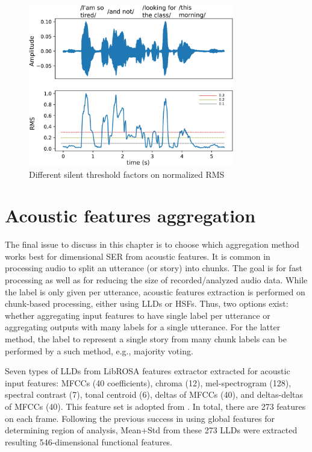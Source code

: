 \begin{figure}[htbp]
  \centering
  \includegraphics[width=0.8\textwidth]{../fig/msp_sa01a-crop}
  \caption{Different silent threshold factors on normalized RMS}
  \label{fig:msp_threshold}
\end{figure}

\section{Acoustic features aggregation}
The final issue to discuss in this chapter is to choose which aggregation
method works best for dimensional SER from acoustic features. It is common in
processing audio to split an utterance (or story) into chunks. The goal is for
fast processing as well as for reducing the size of recorded/analyzed audio
data. While the label is only given per utterance, acoustic features extraction
is performed on chunk-based processing, either using LLDs or HSFs. Thus, two
options exist: whether aggregating input features to have single label per
utterance or aggregating outputs with many labels for a single utterance. For
the latter method, the label to represent a single story from many chunk labels
can be performed by a such method, e.g., majority voting.  

Seven types of LLDs from LibROSA features extractor \cite{McFee2020} extracted
for acoustic input features: MFCCs (40 coefficients), chroma (12),
mel-spectrogram (128), spectral contrast (7), tonal centroid (6), deltas of
MFCCs (40), and deltas-deltas of MFCCs (40).  This feature set is adopted from
\cite{Atmaja2020c}. In total, there are 273 features on each frame. Following
the previous success in using global features for determining region of
analysis, Mean+Std from these 273 LLDs were extracted resulting 546-dimensional
functional features.

